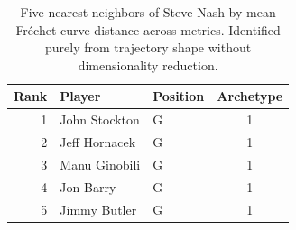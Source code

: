\begin{table}[htbp]
  \centering\small
  \begin{tabular}{rllc}
    \toprule
    Rank & Player & Position & Archetype \\
    \midrule
    1 & John Stockton & G & 1 \\
    2 & Jeff Hornacek & G & 1 \\
    3 & Manu Ginobili & G & 1 \\
    4 & Jon Barry & G & 1 \\
    5 & Jimmy Butler & G & 1 \\
    \bottomrule
  \end{tabular}
  \caption{Five nearest neighbors of Steve Nash by mean Fr\'{e}chet curve distance across metrics. Identified purely from trajectory shape without dimensionality reduction.}
  \label{tab:Steve_Nash_frechet_curve_neighbors}
\end{table}

